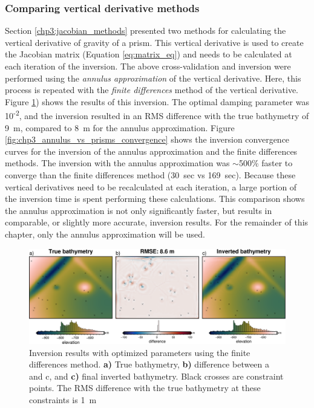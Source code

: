 \subsubsection{Comparing vertical derivative methods} \label{chp3_annulus_vs_prisms}
Section \ref{chp3:jacobian_methods} presented two methods for calculating the vertical derivative of gravity of a prism. This vertical derivative is used to create the Jacobian matrix (Equation \ref{eq:matrix_eq}) and needs to be calculated at each iteration of the inversion. The above cross-validation and inversion were performed using the \textit{annulus approximation} of the vertical derivative. Here, this process is repeated with the \textit{finite differences} method of the vertical derivative. Figure \ref{fig:chp3_simple_prisms_approx_results}) shows the results of this inversion. The optimal damping parameter was 10\textsuperscript{-2}, and the inversion resulted in an RMS difference with the true bathymetry of 9~m, compared to 8~m for the annulus approximation. Figure \ref{fig:chp3_annulus_vs_prisms_convergence} shows the inversion convergence curves for the inversion of the annulus approximation and the finite differences methods. The inversion with the annulus approximation was $\sim$500\% faster to converge than the finite differences method (30~sec vs 169~sec). Because these vertical derivatives need to be recalculated at each iteration, a large portion of the inversion time is spent performing these calculations. This comparison shows the annulus approximation is not only significantly faster, but results in comparable, or slightly more accurate, inversion results. For the remainder of this chapter, only the annulus approximation will be used.

\begin{figure}[!ht]
    \centering
    \includegraphics[width=.95\textwidth]{figures/chp3/chp3_simple_prisms_derivative_results.png}
    \caption[Finite differences inversion results]{Inversion results with optimized parameters using the finite differences method. \textbf{a)} True bathymetry, \textbf{b)} difference between a and c, and \textbf{c)} final inverted bathymetry. Black crosses are constraint points. The RMS difference with the true bathymetry at these constraints is 1~m}
    \label{fig:chp3_simple_prisms_approx_results}
\end{figure}

